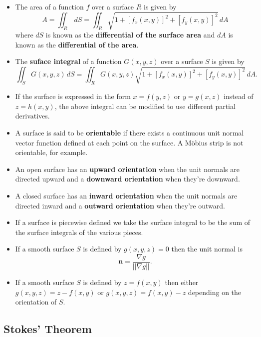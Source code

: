 \documentclass{article}
\begin{document}
\begin{itemize}
  \item The area of a function $f$ over a surface $R$ is given by \[A = \iint_R \,dS = \iint_R \sqrt{1 + [f_x(x, y)]^2 + [f_y(x, y)]^2} \,dA\] where $dS$ is known as the \textbf{differential of the surface area} and $dA$ is known as the \textbf{differential of the area}.

  \item The \textbf{suface integral} of a function $G(x, y, z)$ over a surface $S$ is given by \[\iint_S G(x, y, z) \,dS = \iint_R G(x, y, z) \sqrt{1 + [f_x(x, y)]^2 + [f_y(x, y)]^2} \,dA.\]

  \item If the surface is expressed in the form $x = f(y, z)$ or $y = g(x, z)$ instead of $z = h(x, y)$, the above integral can be modified to use different partial derivatives.

  \item A surface is said to be \textbf{orientable} if there exists a continuous unit normal vector function defined at each point on the surface. A Möbius strip is not orientable, for example.

  \item An open surface has an \textbf{upward orientation} when the unit normals are directed upward and a \textbf{downward orientation} when they're downward.

  \item A closed surface has an \textbf{inward orientation} when the unit normals are directed inward and a \textbf{outward orientation} when they're outward.

  \item If a surface is piecewise defined we take the surface integral to be the sum of the surface integrals of the various pieces.

\item If a smooth surface $S$ is defined by $g(x, y, z) = 0$ then the unit normal is \[\mathbf{n} = \frac{\nabla g}{||\nabla g||}.\]

\item If a smooth surface $S$ is defined by $z = f(x, y)$ then either $g(x, y, z) = z - f(x, y)$ or $g(x, y, z) = f(x, y) - z$ depending on the orientation of $S$.
\end{itemize}

\subsection{Stokes' Theorem}
\end{document}
